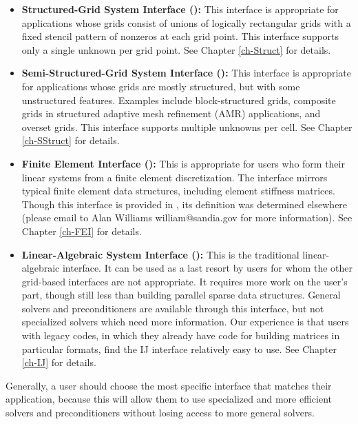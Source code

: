 \begin{itemize}

\item
{\bf Structured-Grid System Interface ():} This interface is
appropriate for applications whose grids consist of unions of logically
rectangular grids with a fixed stencil pattern of nonzeros at each grid point.
This interface supports only a single unknown per grid point.  See Chapter
\ref{ch-Struct} for details.

\item
{\bf Semi-Structured-Grid System Interface ():} This
interface is appropriate for applications whose grids are mostly
structured, but with some unstructured features.  Examples include
block-structured grids, composite grids in structured adaptive mesh
refinement (AMR) applications, and overset grids.  This interface
supports multiple unknowns per cell.
See Chapter \ref{ch-SStruct} for details.

\item
{\bf Finite Element Interface ():} This is appropriate for
users who form their linear systems from a finite element
discretization.  The interface mirrors typical finite element data
structures, including element stiffness matrices.  Though this
interface is provided in \hypre{}, its definition was determined
elsewhere (please email to Alan Williams william@sandia.gov for
more information).  See Chapter \ref{ch-FEI} for details.

\item
{\bf Linear-Algebraic System Interface ():} This is the
traditional linear-algebraic interface.  It can be used as a last
resort by users for whom the other grid-based interfaces are not
appropriate.  It requires more work on the user's part, though still
less than building parallel sparse data structures.  General solvers
and preconditioners are available through this interface, but not
specialized solvers which need more information.  Our experience is
that users with legacy codes, in which they already have code for
building matrices in particular formats, find the IJ interface
relatively easy to use.
See Chapter \ref{ch-IJ} for details.

\end{itemize}

Generally, a user should choose the most specific interface that
matches their application, because this will allow them to use
specialized and more efficient solvers and preconditioners without
losing access to more general solvers.
